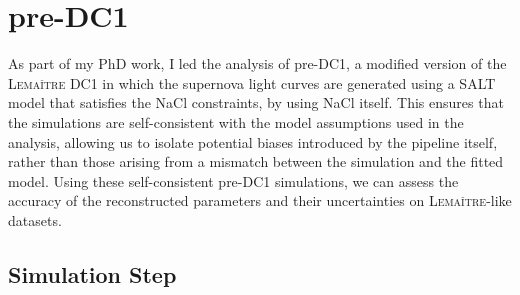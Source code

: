 \section{pre-DC1}

As part of my PhD work, I led the analysis of pre-DC1, a modified version of the \textsc{Lemaître} DC1 in which the supernova light curves 
are generated using a SALT model that satisfies the NaCl constraints, by using NaCl itself. This ensures that the simulations are self-consistent with the model 
assumptions used in the analysis, allowing us to isolate potential biases introduced by the pipeline itself, rather than those arising 
from a mismatch between the simulation and the fitted model. Using these self-consistent pre-DC1 simulations, we can assess the accuracy 
of the reconstructed parameters and their uncertainties on \textsc{Lemaître}-like datasets.

\subsection{Simulation Step}

